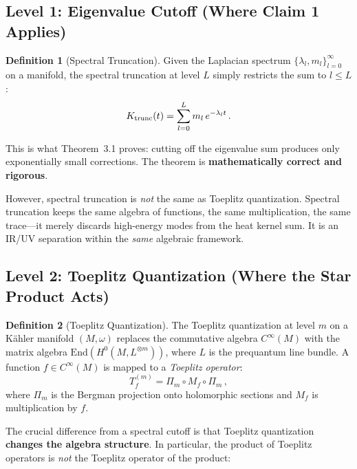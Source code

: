 \documentclass[12pt,a4paper]{article}
\theoremstyle{definition}
\newtheorem{definition}{Definition}
\begin{document}
\subsection{Level 1: Eigenvalue Cutoff (Where Claim 1 Applies)}

\begin{definition}[Spectral Truncation]
Given the Laplacian spectrum $\{\lambda_l, m_l\}_{l=0}^{\infty}$ on a
manifold, the spectral truncation at level $L$ simply restricts the sum
to $l \leq L$:
\begin{equation}
K_{\rm trunc}(t) = \sum_{l=0}^{L} m_l\,e^{-\lambda_l t}\,.
\end{equation}
\end{definition}

This is what Theorem~3.1 proves: cutting off the eigenvalue sum produces
only exponentially small corrections.  The theorem is \textbf{mathematically
correct and rigorous}.

However, spectral truncation is \emph{not} the same as Toeplitz
quantization.  Spectral truncation keeps the same algebra of functions,
the same multiplication, the same trace---it merely discards high-energy
modes from the heat kernel sum.  It is an IR/UV separation within the
\emph{same} algebraic framework.

\subsection{Level 2: Toeplitz Quantization (Where the Star Product Acts)}

\begin{definition}[Toeplitz Quantization]
The Toeplitz quantization at level $m$ on a K\"ahler manifold $(M, \omega)$
replaces the commutative algebra $C^{\infty}(M)$ with the matrix algebra
$\mathrm{End}(H^0(M, L^{\otimes m}))$, where $L$ is the prequantum line
bundle.  A function $f \in C^{\infty}(M)$ is mapped to a \emph{Toeplitz
operator}:
\begin{equation}
T_f^{(m)} = \Pi_m \circ M_f \circ \Pi_m\,,
\end{equation}
where $\Pi_m$ is the Bergman projection onto holomorphic sections and
$M_f$ is multiplication by $f$.
\end{definition}

The crucial difference from a spectral cutoff is that Toeplitz quantization
\textbf{changes the algebra structure}.  In particular, the product of
Toeplitz operators is \emph{not} the Toeplitz operator of the product:
\end{document}
